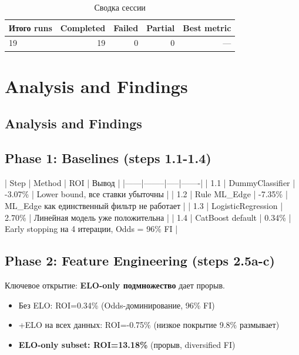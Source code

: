 \documentclass[12pt,a4paper]{article}
\begin{document}
\begin{table}[H]
\centering
\caption{Сводка сессии}
\begin{tabular}{lrrrr}
\toprule
Итого runs & Completed & Failed & Partial & Best metric \\
\midrule
19 & \textcolor{passcolor}{19}
    & \textcolor{failcolor}{0}
    & \textcolor{partialcolor}{0}
    & --- \\
\bottomrule
\end{tabular}
\end{table}







\section{Analysis and Findings}

\subsection{Analysis and Findings}

\subsection{Phase 1: Baselines (steps 1.1-1.4)}

| Step | Method | ROI | Вывод |
|------|--------|-----|-------|
| 1.1 | DummyClassifier | -3.07\% | Lower bound, все ставки убыточны |
| 1.2 | Rule ML\_Edge | -7.35\% | ML\_Edge как единственный фильтр не работает |
| 1.3 | LogisticRegression | 2.70\% | Линейная модель уже положительна |
| 1.4 | CatBoost default | 0.34\% | Early stopping на 4 итерации, Odds = 96\% FI |

\subsection{Phase 2: Feature Engineering (steps 2.5a-c)}

Ключевое открытие: \textbf{ELO-only подмножество} дает прорыв.

\begin{itemize}
  \item Без ELO: ROI=0.34\% (Odds-доминирование, 96\% FI)
  \item +ELO на всех данных: ROI=-0.75\% (низкое покрытие 9.8\% размывает)
  \item \textbf{ELO-only subset: ROI=13.18\%} (прорыв, diversified FI)
\end{itemize}
\end{document}
